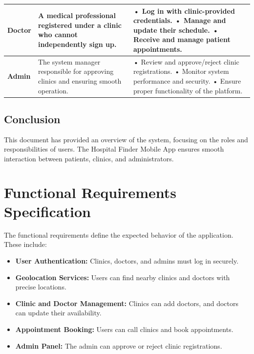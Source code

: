 \documentclass[12pt]{report}
\begin{document}
\begin{longtable}{|p{3cm}|p{6cm}|p{6cm}|}
	\hspace*{0.85cm}\textbf{Doctor}                                                                            & A medical professional registered under a clinic who cannot independently sign up.  &
	• Log in with clinic-provided credentials.\newline
	• Manage and update their schedule.\newline
	• Receive and manage patient appointments.                                                                                                                                                                                            \\
	\hline

	\hspace*{0.85cm}\textbf{Admin}                                                                             & The system manager responsible for approving clinics and ensuring smooth operation. &
	• Review and approve/reject clinic registrations.\newline
	• Monitor system performance and security.\newline
	• Ensure proper functionality of the platform.                                                                                                                                                                                        \\
	\hline
\end{longtable}

\subsection{Conclusion}
This document has provided an overview of the system, focusing on the roles and responsibilities of users. The Hospital Finder Mobile App ensures smooth interaction between patients, clinics, and administrators.
\vspace{0.5cm}
\section{\textbf{Functional Requirements Specification}}

\noindent The functional requirements define the expected behavior of the application. These include:

\begin{itemize}
	\item \textbf{User Authentication:} Clinics, doctors, and admins must log in securely.
	\item \textbf{Geolocation Services:} Users can find nearby clinics and doctors with precise locations.
	\item \textbf{Clinic and Doctor Management:} Clinics can add doctors, and doctors can update their availability.
	\item \textbf{Appointment Booking:} Users can call clinics and book appointments.
	\item \textbf{Admin Panel:} The admin can approve or reject clinic registrations.
\end{itemize}
\end{document}
